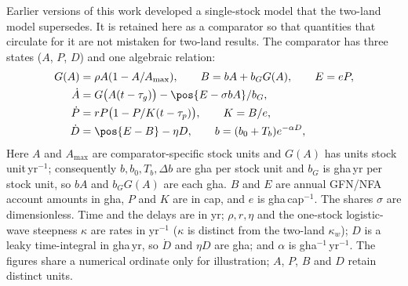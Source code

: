 Earlier versions of this work developed a single-stock model that the two-land model supersedes. It is retained here as a comparator so that quantities that circulate for it are not mistaken for two-land results. The comparator has three states ($A$, $P$, $D$) and one algebraic relation:
\begin{align}
G(A)&=\rho A(1-A/A_{\max}),\qquad B=bA+b_GG(A),\qquad E=eP,\\
\dot A&=G\big(A(t-\tau_g)\big)-\pos{E-\sigma bA}/b_G,\\
\dot P&=rP\big(1-P/K(t-\tau_p)\big),\qquad K=B/e,\\
\dot D&=\pos{E-B}-\eta D,\qquad b=(b_0+T_b)e^{-\alpha D},
\end{align}
Here $A$ and $A_{\max}$ are comparator-specific stock units and $G(A)$ has units stock unit\,yr$^{-1}$; consequently $b,b_0,T_b,\Delta b$ are gha per stock unit and $b_G$ is gha\,yr per stock unit, so $bA$ and $b_GG(A)$ are each gha. $B$ and $E$ are annual GFN/NFA account amounts in gha, $P$ and $K$ are in cap, and $e$ is gha\,cap$^{-1}$. The shares $\sigma$ are dimensionless. Time and the delays are in yr; $\rho,r,\eta$ and the one-stock logistic-wave steepness $\kappa$ are rates in yr$^{-1}$ ($\kappa$ is distinct from the two-land $\kappa_w$); $D$ is a leaky time-integral in gha\,yr, so $\dot D$ and $\eta D$ are gha; and $\alpha$ is gha$^{-1}$\,yr$^{-1}$. The figures share a numerical ordinate only for illustration; $A$, $P$, $B$ and $D$ retain distinct units.


